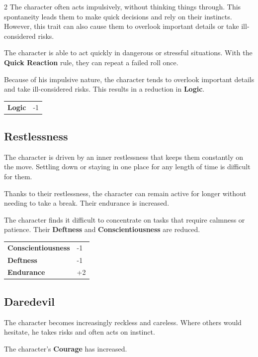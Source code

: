 \begin{multicols}{2}
    The character often acts impulsively, without thinking things through. This spontaneity leads them to make quick decisions and rely on their instincts. However, this trait can also cause them to overlook important details or take ill-considered risks.

    The character is able to act quickly in dangerous or stressful situations. With the \textbf{Quick Reaction} rule, they can repeat a failed roll once.

    Because of his impulsive nature, the character tends to overlook important details and take ill-considered risks. This results in a reduction in \textbf{Logic}.

    \begin{tabular}{@{}ll@{}}
        \textbf{Logic} & -1\\
    \end{tabular}

    \subsection*{Restlessness}

    The character is driven by an inner restlessness that keeps them constantly on the move. Settling down or staying in one place for any length of time is difficult for them.

    Thanks to their restlessness, the character can remain active for longer without needing to take a break. Their endurance is increased.

    The character finds it difficult to concentrate on tasks that require calmness or patience. Their \textbf{Deftness} and \textbf{Conscientiousness} are reduced.

    \begin{tabular}{@{}ll@{}}
        \textbf{Conscientiousness} & -1\\
        \textbf{Deftness} & -1\\
        \textbf{Endurance} & +2\\
    \end{tabular}

    \subsection*{Daredevil}

    The character becomes increasingly reckless and careless. Where others would hesitate, he takes risks and often acts on instinct.

    The character's \textbf{Courage} has increased.


\end{multicols}
